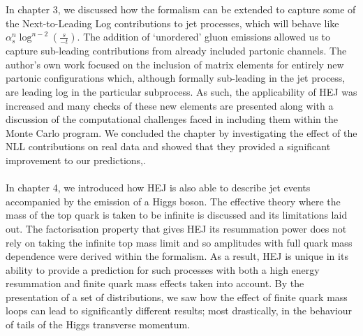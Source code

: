 In chapter 3, we discussed how the formalism can be extended to capture some of the Next-to-Leading Log contributions to jet processes, which will behave like $\alpha_s^{n} \log^{n-2}\left(\frac{s}{-t} \right)$. The addition of `unordered' gluon emissions allowed us to capture sub-leading contributions from already included partonic channels. The author's own work focused on the inclusion of matrix elements for entirely new partonic configurations which, although formally sub-leading in the jet process, are leading log in the particular subprocess. As such, the applicability of HEJ was increased and many checks of these new elements are presented along with a discussion of the computational challenges faced in including them within the Monte Carlo program. We concluded the chapter by investigating the effect of the NLL contributions on real data and showed that they provided a significant improvement to our predictions,. \\
\\
In chapter 4, we introduced how HEJ is also able to describe jet events accompanied by the emission of a Higgs boson. The effective theory where the mass of the top quark is taken to be infinite is discussed and its limitations laid out. The factorisation property that gives HEJ its resummation power does not rely on taking the infinite top mass limit and so amplitudes with full quark mass dependence were derived within the formalism. As a result, HEJ is unique in its ability to provide a prediction for such processes with both a high energy resummation and finite quark mass effects taken into account. By the presentation of a set of distributions, we saw how the effect of finite quark mass loops can lead to significantly different results; most drastically, in the behaviour of tails of the Higgs transverse momentum. \\
\\
